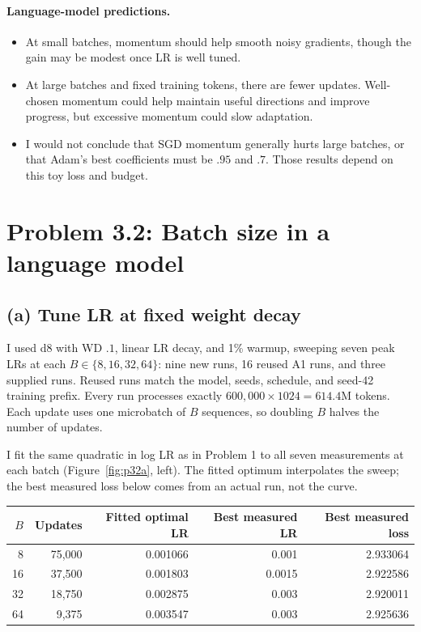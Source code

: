 \documentclass{article}
\begin{document}
\paragraph{Language-model predictions.}
\begin{itemize}
    \item At small batches, momentum should help smooth noisy gradients,
    though the gain may be modest once LR is well tuned.
    \item At large batches and fixed training tokens, there are fewer
    updates. Well-chosen momentum could help maintain useful directions
    and improve progress, but excessive momentum could slow adaptation.
    \item I would not conclude that SGD momentum generally hurts large
    batches, or that Adam's best coefficients must be $.95$ and $.7$.
    Those results depend on this toy loss and budget.
\end{itemize}

\section{Problem 3.2: Batch size in a language model}
\subsection{(a) Tune LR at fixed weight decay}

I used d8 with WD $.1$, linear LR decay, and 1\% warmup, sweeping seven
peak LRs at each $B\in\{8,16,32,64\}$: nine new runs, 16 reused A1 runs,
and three supplied runs. Reused runs match the model, seeds, schedule,
and seed-42 training prefix. Every run processes exactly
$600{,}000\times1024=614.4$M tokens. Each update uses one microbatch of
$B$ sequences, so doubling $B$ halves the number of updates.

I fit the same quadratic in log LR as in Problem 1 to all seven
measurements at each batch (Figure~\ref{fig:p32a}, left).
The fitted optimum interpolates the sweep;
the best measured loss below comes from an actual run, not the curve.

\begin{center}
\small
\begin{tabular}{rrrrr}
\toprule
$B$ & Updates & Fitted optimal LR & Best measured LR & Best measured loss \\
\midrule
8  & 75,000 & 0.001066 & 0.001  & 2.933064 \\
16 & 37,500 & 0.001803 & 0.0015 & 2.922586 \\
32 & 18,750 & 0.002875 & 0.003  & 2.920011 \\
64 & 9,375  & 0.003547 & 0.003  & 2.925636 \\
\bottomrule
\end{tabular}
\end{center}
\end{document}
